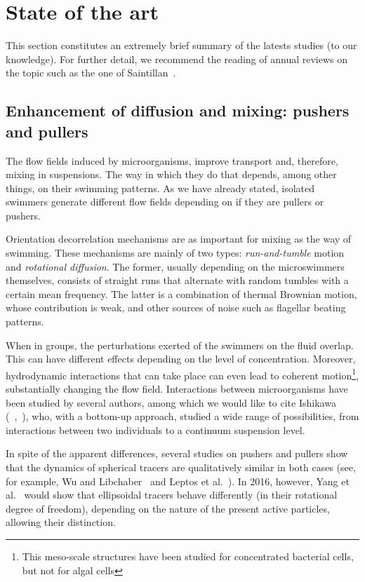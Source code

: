 \chapter{State of the art}
\label{SOA}

This section constitutes an extremely brief summary of the latests studies (to our knowledge). For further detail, we recommend the reading of annual reviews on the topic such as the one of Saintillan~\cite{Saintillan}.

\section{Enhancement of diffusion and mixing: pushers and pullers}

The flow fields induced by microorganisms, improve transport and, therefore, mixing in suspensions. The way in which they do that depends, among other things, on their swimming patterns. As we have already stated, isolated swimmers generate different flow fields depending on if they are pullers or pushers. 

Orientation decorrelation mechanisms are as important for mixing as the way of swimming. These mechanisms are mainly of two types: \textit{run-and-tumble} motion and \textit{rotational diffusion}. The former, usually depending on the microswimmers themselves, consists of straight runs that alternate with random tumbles with a certain mean frequency. The latter is a combination of thermal Brownian motion, whose contribution is weak, and other sources of noise such as flagellar beating patterns.

When in groups, the perturbations exerted of the swimmers on the fluid overlap. This can have different effects depending on the level of concentration. Moreover, hydrodynamic interactions that can take place can even lead to coherent motion\footnote{This meso-scale structures have been studied for concentrated bacterial cells, but not for algal cells}, substantially changing the flow field. Interactions between microorganisms have been studied by several authors, among which we would like to cite Ishikawa (~\cite{Ishikawa},~\cite{Ishikawa9}), who, with a bottom-up approach, studied a wide range of possibilities, from interactions between two individuals to a continuum suspension level.

In spite of the apparent differences, several studies on pushers and pullers show that the dynamics of spherical tracers are qualitatively similar in both cases (see, for example, Wu and Libchaber~\cite{Wu} and Leptos et al.~\cite{Leptos}). In 2016, however, Yang et al.~\cite{Yang} would show that ellipsoidal tracers behave differently (in their rotational degree of freedom), depending on the nature of the present active particles, allowing their distinction.

